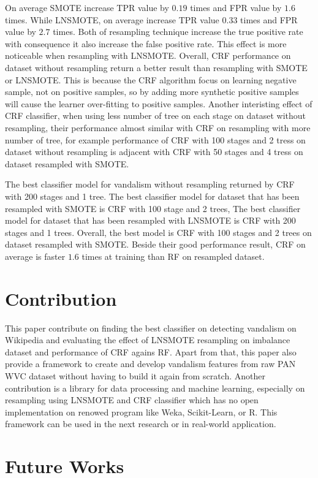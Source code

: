 \documentclass[conference,compsoc,a4paper,twocolumn,final]{IEEEtran}
\begin{document}
On average SMOTE increase TPR value by $0.19$ times and FPR value by $1.6$
times.
While LNSMOTE, on average increase TPR value $0.33$ times and FPR
value by $2.7$ times.
Both of resampling technique increase the true positive rate with consequence
it also increase the false positive rate.
This effect is more noticeable when resampling with LNSMOTE.
Overall, CRF performance on dataset without resampling return a better result
than resampling with SMOTE or LNSMOTE.
This is because the CRF algorithm focus on learning negative sample, not on
positive samples, so by adding more synthetic positive samples will cause the
learner over-fitting to positive samples.
Another interisting effect of CRF classifier, when using less number of tree on
each stage on dataset without resampling, their performance almost similar with
CRF on resampling with more number of tree, for example performance of CRF with
100 stages and 2 tress on dataset without resampling is adjacent with CRF with
50 stages and 4 tress on dataset resampled with SMOTE.

The best classifier model for vandalism without resampling returned by CRF with
200 stages and 1 tree.
The best classifier model for dataset that has been resampled with SMOTE is CRF
with 100 stage and 2 trees,
The best classifier model for dataset that has been resampled with LNSMOTE is
CRF with 200 stages and 1 trees.
Overall, the best model is CRF with 100 stages and 2 trees on dataset resampled
with SMOTE.
Beside their good performance result, CRF on average is faster $1.6$ times at
training than RF on resampled dataset.

\section{Contribution}

This paper contribute on finding the best classifier on detecting vandalism on
Wikipedia and evaluating the effect of LNSMOTE resampling on imbalance dataset
and performance of CRF agains RF.
Apart from that, this paper also provide a framework to create and develop
vandalism features from raw PAN WVC dataset without having to build it again
from scratch.
Another contribution is a library for data processing and machine learning,
especially on resampling using LNSMOTE and CRF classifier which has no
open implementation on renowed program like Weka, Scikit-Learn, or R.
This framework can be used in the next research or in real-world application.

\section{Future Works}
\end{document}
